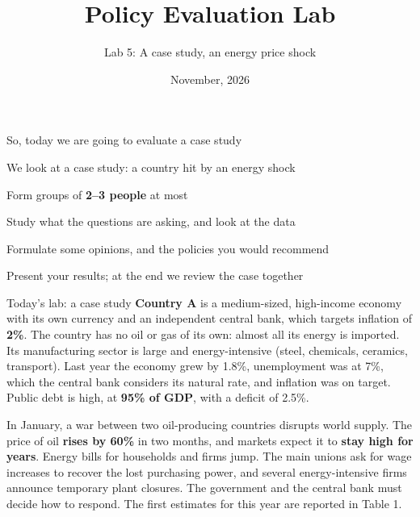 \documentclass[aspectratio=169,xcolor=table]{beamer}
\title[Policy Evaluation Lab]{Policy Evaluation Lab}
\subtitle[Lab 5]{Lab 5: A case study, an energy price shock}
\date[\pelYear]{November, 2026}
\begin{document}
\frame{\titlepage}

\begin{frame}{So, today we are going to evaluate a case study}
\be
  \item We look at a case study: a country hit by an energy shock
  \item Form groups of \textbf{2--3 people} at most
  \item Study what the questions are asking, and look at the data
  \item Formulate some opinions, and the policies you would recommend
  \item Present your results; at the end we review the case together
\ee
\end{frame}

\begin{frame}{Today's lab: a case study}
\footnotesize
\textbf{Country A} is a medium-sized, high-income economy with its own currency and an independent central bank, which targets inflation of \textbf{2\%}. The country has no oil or gas of its own: almost all its energy is imported. Its manufacturing sector is large and energy-intensive (steel, chemicals, ceramics, transport). Last year the economy grew by 1.8\%, unemployment was at 7\%, which the central bank considers its natural rate, and inflation was on target. Public debt is high, at \textbf{95\% of GDP}, with a deficit of 2.5\%.

\vspace{0.15cm}
In January, a war between two oil-producing countries disrupts world supply. The price of oil \textbf{rises by 60\%} in two months, and markets expect it to \textbf{stay high for years}. Energy bills for households and firms jump. The main unions ask for wage increases to recover the lost purchasing power, and several energy-intensive firms announce temporary plant closures. The government and the central bank must decide how to respond. The first estimates for this year are reported in Table 1.
\end{frame}
\end{document}
